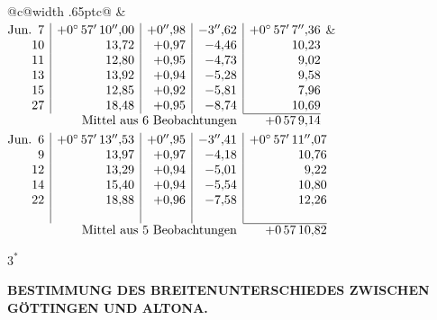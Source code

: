 \noindent\begin{tabular}{@{}c@{\hspace{.4em}\vrule width .65pt\hspace{.4em}}c@{}}
 &
 \\[.18ex]
\(\begin{array}[t]{@{}r|r|r|r|r@{}}
\text{Jun.}\enspace 7 & +0^\circ\,57'\,10''{,}00 & +0''{,}98 & -3''{,}62 & +0^\circ\,57'\,7''{,}36\\
10 & 13{,}72 & +0{,}97 & -4{,}46 & 10{,}23\\
11 & 12{,}80 & +0{,}95 & -4{,}73 & 9{,}02\\
13 & 13{,}92 & +0{,}94 & -5{,}28 & 9{,}58\\
15 & 12{,}85 & +0{,}92 & -5{,}81 & 7{,}96\\
27 & 18{,}48 & +0{,}95 & -8{,}74 & 10{,}69\\
\cline{5-5}
\multicolumn{4}{r}{\text{Mittel aus 6 Beobachtungen}} & +0\,57\,9{,}14
\end{array}\)
&
\(\begin{array}[t]{@{}r|r|r|r|r@{}}
\text{Jun.}\enspace 6 & +0^\circ\,57'\,13''{,}53 & +0''{,}95 & -3''{,}41 & +0^\circ\,57'\,11''{,}07\\
9 & 13{,}97 & +0{,}97 & -4{,}18 & 10{,}76\\
12 & 13{,}29 & +0{,}94 & -5{,}01 & 9{,}22\\
14 & 15{,}40 & +0{,}94 & -5{,}54 & 10{,}80\\
22 & 18{,}88 & +0{,}96 & -7{,}58 & 12{,}26\\
 & & & & \\
\cline{5-5}
\multicolumn{4}{r}{\text{Mittel aus 5 Beobachtungen}} & +0\,57\,10{,}82
\end{array}\)
\end{tabular}\par\medskip
\noindent\hfill \(3^{*}\)\hspace{.12\textwidth}\par

\par\clearpage
\noindent{}\parbox[t]{\dimexpr\linewidth-24mm\relax}{\centering\scriptsize\bfseries BESTIMMUNG DES BREITENUNTERSCHIEDES ZWISCHEN GÖTTINGEN UND ALTONA.}\makebox[12mm][r]{}\par\medskip

